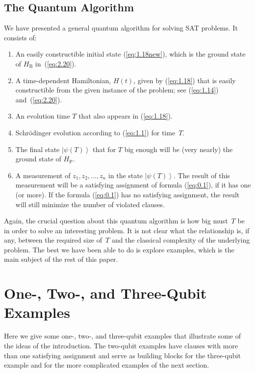 \documentclass[twoside]{article}
\newcommand{\ket}[1]{\left|#1\right\rangle}
\newcommand{\refEq}[1]{(\ref{eq:#1})}
\newcommand{\rP}{{\mathrm{P}}}
\newcommand{\rB}{{\mathrm{B}}}
\numberwithin{equation}{section}
\begin{document}
\subsection{The Quantum Algorithm} We have presented a general
quantum algorithm for solving SAT problems.  It consists of: 
\begin{enumerate}

\item An easily constructible initial state \refEq{1.18new}, which is the
ground state of $H_\rB$ in~\refEq{2.20}.

\item A time-dependent Hamiltonian, $H(t)$, given by \refEq{1.18} that is 
easily constructible from the given instance of the problem; see
\refEq{1.14} and~\refEq{2.20}.

\item An evolution time $T$ that also appears in \refEq{1.18}.

\item Schr\"odinger evolution according to \refEq{1.1} for time~$T$. 

\item The final state $\ket{\psi(T)}$ that for $T$ big enough will be (very
nearly) the ground state of $H_\rP$.

\item A measurement of $z_1, z_2, \dots, z_n$ in the state $\ket{\psi(T)}$.
The result of this measurement will be a satisfying assignment of formula
\refEq{0.1}, if it has one (or more). If the formula \refEq{0.1} has no
satisfying assignment, the result will still minimize the number of violated
clauses. 

\end{enumerate}

Again, the crucial question about this quantum algorithm is how big
must~$T$ be in order to solve an interesting problem.  It is not clear what
the relationship is, if any, between the required size of~$T$ and the classical
complexity of the underlying problem. The best we have been able to do is
explore examples, which is the main subject of the rest of this paper. 

\section{One-, Two-, and Three-Qubit Examples}\label{sec:2}
\setcounter{equation}{0} Here we give some one-, two-, and three-qubit
examples that illustrate some of the ideas of the introduction. 
The two-qubit examples have clauses with more than one satisfying
assignment and serve as building blocks for the three-qubit example and
 for the more complicated examples of the next
section. 
\end{document}
